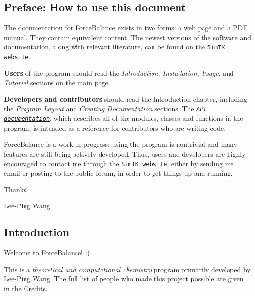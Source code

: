 \hypertarget{index_preface_sec}{}\subsection{\-Preface\-: How to use this document}\label{index_preface_sec}
\-The documentation for \-Force\-Balance exists in two forms\-: a web page and a \-P\-D\-F manual. \-They contain equivalent content. \-The newest versions of the software and documentation, along with relevant literature, can be found on the \href{https://simtk.org/home/forcebalance/}{\tt \-Sim\-T\-K website}.

{\bfseries \-Users} of the program should read the {\itshape \-Introduction, \-Installation\/}, {\itshape \-Usage\/}, and {\itshape \-Tutorial\/} sections on the main page.

{\bfseries \-Developers and contributors} should read the \-Introduction chapter, including the {\itshape \-Program \-Layout\/} and {\itshape \-Creating \-Documentation\/} sections. \-The {\itshape \href{http://leeping.github.io/forcebalance/doc/html/api/roadmap.html}{\tt \-A\-P\-I documentation}\/}, which describes all of the modules, classes and functions in the program, is intended as a reference for contributors who are writing code.

\-Force\-Balance is a work in progress; using the program is nontrivial and many features are still being actively developed. \-Thus, users and developers are highly encouraged to contact me through the \href{https://simtk.org/home/forcebalance/}{\tt \-Sim\-T\-K website}, either by sending me email or posting to the public forum, in order to get things up and running.

\-Thanks!

\-Lee-\/\-Ping \-Wang\hypertarget{index_intro_sec}{}\subsection{\-Introduction}\label{index_intro_sec}
\-Welcome to \-Force\-Balance! \-:)

\-This is a {\itshape  theoretical and computational chemistry \/} program primarily developed by \-Lee-\/\-Ping \-Wang. \-The full list of people who made this project possible are given in the \hyperlink{index_credits}{\-Credits}.

